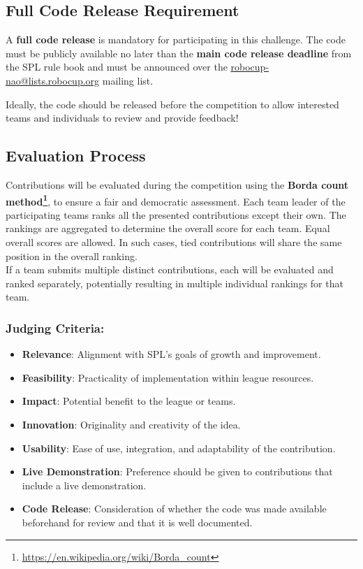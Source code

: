 \subsection{Full Code Release Requirement}
A \textbf{full code release} is mandatory for participating in this challenge. The code must be publicly available no later than the \textbf{main code release deadline} from the SPL rule book and must be announced over the \url{robocup-nao@lists.robocup.org} mailing list.

Ideally, the code should be released before the competition to allow interested teams and individuals to review and provide feedback!



\subsection{Evaluation Process}
Contributions will be evaluated during the competition using the \textbf{Borda count method\footnote{\url{https://en.wikipedia.org/wiki/Borda_count}}}, to ensure a fair and democratic assessment. Each team leader of the participating teams ranks all the presented contributions except their own. The rankings are aggregated to determine the overall score for each team. Equal overall scores are allowed. In such cases, tied contributions will share the same position in the overall ranking.\\
If a team submits multiple distinct contributions, each will be evaluated and ranked separately, potentially resulting in multiple individual rankings for that team.

\subsubsection*{Judging Criteria:}
\begin{itemize}
    \item \textbf{Relevance}: Alignment with SPL’s goals of growth and improvement.
    \item \textbf{Feasibility}: Practicality of implementation within league resources.
    \item \textbf{Impact}: Potential benefit to the league or teams.
    \item \textbf{Innovation}: Originality and creativity of the idea.
    \item \textbf{Usability}: Ease of use, integration, and adaptability of the contribution.
    \item \textbf{Live Demonstration}: Preference should be given to contributions that include a live demonstration.
    \item \textbf{Code Release}: Consideration of whether the code was made available beforehand for review and that it is well documented.
\end{itemize}

